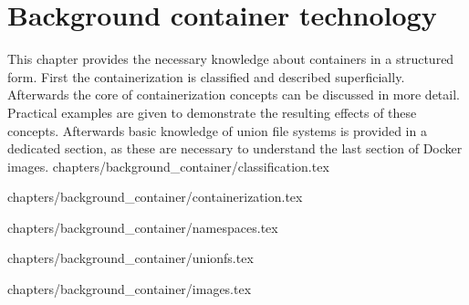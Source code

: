 \chapter{Background container technology}
\label{ch:back}

This chapter provides the necessary knowledge about containers in a structured form.
First the containerization is classified and described superficially. Afterwards the core of containerization concepts can be discussed in more detail.
Practical examples are given to demonstrate the resulting effects of these concepts.
Afterwards basic knowledge of union file systems is provided in a dedicated section, as these are necessary to understand the last section of Docker images.
 {chapters/background_container/classification.tex}

 {chapters/background_container/containerization.tex}

 {chapters/background_container/namespaces.tex}


 {chapters/background_container/unionfs.tex}

 {chapters/background_container/images.tex}


















